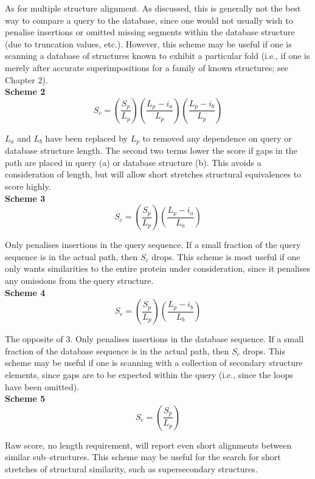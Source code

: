 As for multiple structure alignment.   As discussed, this is generally not the 
best way to compare a 
query to the database, since one would not usually wish to penalise insertions
or omitted missing segments within the database structure (due to truncation values,
etc.).  However, this scheme may be useful if one is scanning a database of
structures known to exhibit a particular fold (i.e., if one is merely after 
accurate superimpositions for a family of known structures; see Chapter 2).\\

{\bf Scheme 2}\\
\[
S_{c} =
\left(
\frac{S_{p}}{L_{p}}
\right)
\left(
\frac{L_{p}-i_{a}}{L_{p}}
\right)
\left(
\frac{L_{p}-i_{b}}{L_{p}}
\right)
\]

$L_{a}$ and $L_{b}$ have been replaced by $L_{p}$ to removed any dependence
on query or database structure length.  The second two terms
lower the score if gaps in the path are placed in query (a) or 
database structure (b).  This avoids a consideration of length, but will
allow short stretches structural equivalences to score highly.\\

{\bf Scheme 3}
\[
S_{c} =
\left(
\frac{S_{p}}{L_{p}}
\right)
\left(
\frac{L_{p}-i_{a}}{L_{a}}
\right)
\]


Only penalises insertions in the query sequence.  If a small
fraction of the query sequence is in the actual path, then
$S_{c}$ drops.  
This scheme is most useful if one only wants similarities
to the entire protein under consideration, since it penalises
any omissions from the query structure.\\

{\bf Scheme 4}
\[
S_{c} =
\left(
\frac{S_{p}}{L_{p}}
\right)
\left(
\frac{L_{p}-i_{b}}{L_{b}}
\right)
\]

The opposite of 3.  Only penalises insertions in the database sequence.  
If a small fraction of the database sequence is in the actual path, then $S_{c}$ 
drops.  This scheme may be useful if one is scanning with a collection of
secondary structure elements, since gaps are to be expected within the 
query (i.e., since the loops have been omitted).\\


{\bf Scheme 5}
\[
S_{c} =
\left(
\frac{S_{p}}{L_{p}}
\right)
\]

Raw score, no length requirement, will report even short alignments between
similar sub--structures.  This scheme may be useful for the search for
short stretches of structural similarity, such as supersecondary structures.\\

